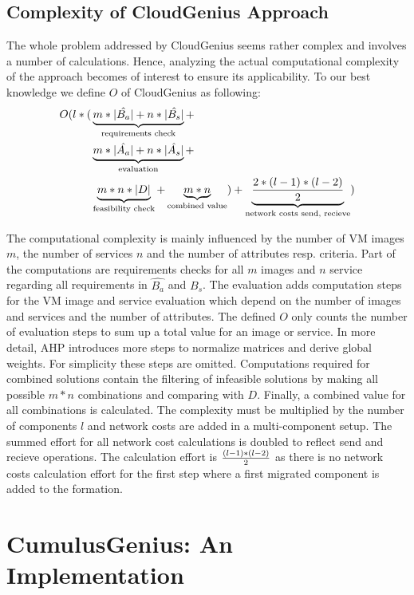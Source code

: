 \documentclass[10pt]{article}
\begin{document}
\subsection{Complexity of CloudGenius Approach}

The whole problem addressed by CloudGenius seems rather complex and involves a number of calculations. Hence, analyzing the actual computational complexity of the approach becomes of interest to ensure its applicability. To our best knowledge we define $O$ of CloudGenius as following:
\begin{align*}
O(l * (
&\underbrace{m*|\hat{B_a}|+n*|\hat{B_s}|}_{\text{requirements check}} +\\
&\underbrace{m*|\hat{A_a}|+n*|\hat{A_s}|}_{\text{evaluation}} +\\
&\underbrace{m*n*|D|}_{\text{feasibility check}} + \underbrace{m*n}_{\text{combined value}}) + \underbrace{2* {(l-1)*(l-2)}\over{2}}_{\text{network costs send, recieve}}
)
\end{align*}

The computational complexity is mainly influenced by the number of VM images $m$, the number of services $n$ and the number of attributes resp. criteria. Part of the computations are requirements checks for all $m$ images and $n$ service regarding all requirements in $\hat{B_a}$ and $\hat{B_s}$. The evaluation adds computation steps for the VM image and service evaluation which depend on the number of images and services and the number of attributes. The defined $O$ only counts the number of evaluation steps to sum up a total value for an image or service. In more detail, AHP introduces more steps to normalize matrices and derive global weights. For simplicity these steps are omitted. Computations required for combined solutions contain the filtering of infeasible solutions by making all possible $m*n$ combinations and comparing with $D$. Finally, a combined value for all combinations is calculated. 
The complexity must be multiplied by the number of components $l$ and network costs are added in a multi-component setup. The summed effort for all network cost calculations is doubled to reflect send and recieve operations. The calculation effort is $(l-1)*(l-2)\over{2}$ as there is no network costs calculation effort for the first step where a first migrated component is added to the formation. 



\section{CumulusGenius: An Implementation}\label{prototype}
\end{document}

